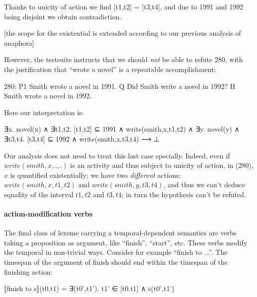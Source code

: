 \documentclass[a4paper,11pt]{article}
\begin{document}
Thanks to unicity of action we find [t1,t2] = [t3,t4], and due to 1991
and 1992 being disjoint we obtain contradiction.

[the scope
for the existential is extended according to our previous analysis of
anaphora]

However, the testsuite instructs that we should \emph{not} be able to refute
280, with the justification that ``wrote a novel'' is a repeatable
accomplishment:

280:
P1	Smith wrote a novel in 1991.
Q 	Did Smith write a novel in 1992?
H 	Smith wrote a novel in 1992.

Here our interpretation is:

∃x. novel(x) ∧
∃t1,t2. [t1,t2] ⊆ 1991 ∧ write(smith,x,t1,t2) ∧
∃y. novel(y) ∧
∃t3,t4. [t3,t4] ⊆ 1992 ∧ write(smith,x,t3,t4)
⟶ ⊥

Our analysis does not need to treat this last case specially. Indeed,
even if $write(smith,x,.,.)$ is an activity and thus subject to
unicity of action, in (280), $x$ is quantified existentially; we have
two \emph{different} actions: $write(smith,x,t1,t2)$ and
$write(smith,y,t3,t4)$, and thus we can't deduce equality of the
interval $t1,t2$ and $t3,t4$; in turn the hypothesis can't be refuted.


\paragraph{action-modification verbs}

The final class of lexeme carrying a temporal-dependent semantics are
verbs taking a proposition as argument, like ``finish'', ``start'',
etc. These verbs modify the temporal in non-trivial ways. Consider for
example ``finish to ...''. The timespan of the argument of finish
should end within the timespan of the finishing action:

⟦finish to s⟧(t0,t1) = ∃(t0',t1'). t1' ∈ [t0,t1] ∧ s(t0',t1')
\end{document}
